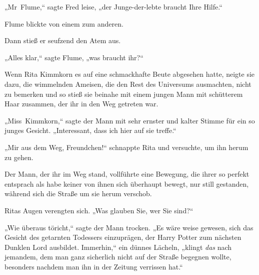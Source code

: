 „Mr~Flume,“ sagte Fred leise, „der Junge-der-lebte braucht Ihre Hilfe.“

Flume blickte von einem zum anderen.

Dann stieß er seufzend den Atem aus.

„Alles klar,“ sagte Flume, „was braucht ihr?“


Wenn Rita Kimmkorn es auf eine schmackhafte Beute abgesehen hatte, neigte sie dazu, die wimmelnden Ameisen, die den Rest des Universums ausmachten, nicht zu bemerken und so stieß sie beinahe mit einem jungen Mann mit schütterem Haar zusammen, der ihr in den Weg getreten war.

„Miss~Kimmkorn,“ sagte der Mann mit sehr ernster und kalter Stimme für ein so junges Gesicht. „Interessant, dass ich hier auf sie treffe.“

„Mir aus dem Weg, Freundchen!“ schnappte Rita und versuchte, um ihn herum zu gehen.

Der Mann, der ihr im Weg stand, vollführte eine Bewegung, die ihrer so perfekt entsprach als habe keiner von ihnen sich überhaupt bewegt, nur still gestanden, während sich die Straße um sie herum verschob.

Ritas Augen verengten sich. „Was glauben Sie, wer Sie sind?“

„Wie überaus töricht,“ sagte der Mann trocken. „Es wäre weise gewesen, sich das Gesicht des getarnten Todessers einzuprägen, der Harry Potter zum nächsten Dunklen Lord ausbildet. Immerhin,“ ein dünnes Lächeln, „klingt \emph{das} nach jemandem, dem man ganz sicherlich nicht auf der Straße begegnen wollte, besonders nachdem man ihn in der Zeitung verrissen hat.“

